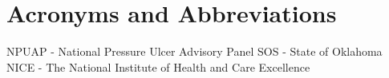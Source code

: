 \chapter*{Acronyms and Abbreviations}

\vspace{5mm}
NPUAP - National Pressure Ulcer Advisory Panel
SOS - State of Oklahoma
NICE - The National Institute of Health and Care Excellence



